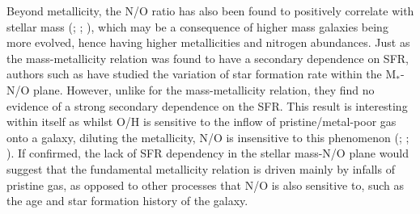 \documentclass[usenatbib]{mnras} %
\begin{document}
Beyond metallicity, the N/O ratio has also been found to positively correlate with stellar mass (\citealt{PMC_2009}; \citealt{Perez-Montero_2013}; \citealt{AndrewsMartini_2013}), which may be a consequence of higher mass galaxies being more evolved, hence having higher metallicities and nitrogen abundances. Just as the mass-metallicity relation was found to have a secondary dependence on SFR, authors such as \cite{Perez-Montero_2013} have studied the variation of star formation rate within the M$_{*}$-N/O plane. However, unlike for the mass-metallicity relation, they find no evidence of a strong secondary dependence on the SFR. This result is interesting within itself as whilst O/H is sensitive to the inflow of pristine/metal-poor gas onto a galaxy, diluting the metallicity, N/O is insensitive to this phenomenon (\citealt{Koppen_2005}; \citealt{Belfiore_2015}; \citealt{Kashino_2016}). If confirmed, the lack of SFR dependency in the stellar mass-N/O plane would suggest that the fundamental metallicity relation is driven mainly by infalls of pristine gas, as opposed to other processes that N/O is also sensitive to, such as the age and star formation history of the galaxy. 

\end{document}

